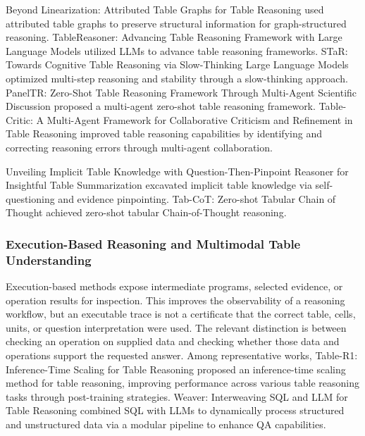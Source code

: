 Beyond Linearization: Attributed Table Graphs for Table Reasoning \cite{gao2024attributedtablegraph} used attributed table graphs to preserve structural information for graph-structured reasoning. TableReasoner: Advancing Table Reasoning Framework with Large Language Models \cite{singh2024tablereasoner} utilized LLMs to advance table reasoning frameworks. STaR: Towards Cognitive Table Reasoning via Slow-Thinking Large Language Models \cite{wang2024starcognitive} optimized multi-step reasoning and stability through a slow-thinking approach. PanelTR: Zero-Shot Table Reasoning Framework Through Multi-Agent Scientific Discussion \cite{liu2024paneltr} proposed a multi-agent zero-shot table reasoning framework. Table-Critic: A Multi-Agent Framework for Collaborative Criticism and Refinement in Table Reasoning \cite{zhang2024tablecritic} improved table reasoning capabilities by identifying and correcting reasoning errors through multi-agent collaboration.

Unveiling Implicit Table Knowledge with Question-Then-Pinpoint Reasoner for Insightful Table Summarization \cite{kim2024qtp} excavated implicit table knowledge via self-questioning and evidence pinpointing. Tab-CoT: Zero-shot Tabular Chain of Thought \cite{li2024tabcot} achieved zero-shot tabular Chain-of-Thought reasoning.

\subsubsection{Execution-Based Reasoning and Multimodal Table Understanding}
Execution-based methods expose intermediate programs, selected evidence, or operation results for inspection. This improves the observability of a reasoning workflow, but an executable trace is not a certificate that the correct table, cells, units, or question interpretation were used. The relevant distinction is between checking an operation on supplied data and checking whether those data and operations support the requested answer. Among representative works, Table-R1: Inference-Time Scaling for Table Reasoning \cite{yang2025tablegpt1} proposed an inference-time scaling method for table reasoning, improving performance across various table reasoning tasks through post-training strategies. Weaver: Interweaving SQL and LLM for Table Reasoning \cite{weaver2025} combined SQL with LLMs to dynamically process structured and unstructured data via a modular pipeline to enhance QA capabilities.

